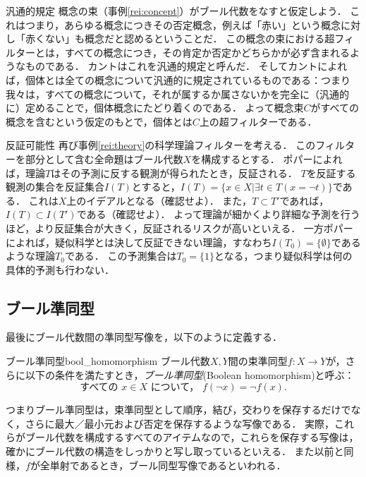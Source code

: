 \documentclass[11pt,a4paper, dvipdfmx]{jsarticle}
\begin{document}
\begin{rei}{汎通的規定}{}
概念の束（事例\ref{rei:concept}）がブール代数をなすと仮定しよう．
これはつまり，あらゆる概念につきその否定概念，例えば「赤い」という概念に対し「赤くない」も概念だと認めるということだ．
この概念の束における超フィルターとは，すべての概念につき，その肯定か否定かどちらかが必ず含まれるようなものである．
カントはこれを汎通的規定と呼んだ．
そしてカントによれば，個体とは全ての概念について汎通的に規定されているものである：つまり我々は，すべての概念について，それが属するか属さないかを完全に（汎通的に）定めることで，個体概念にたどり着くのである．
よって概念束$C$がすべての概念を含むという仮定のもとで，個体とは$C$上の超フィルターである．
\end{rei}

\begin{rei}{反証可能性}{}
    再び事例\ref{rei:theory}の科学理論フィルターを考える．
    このフィルターを部分として含む全命題はブール代数$X$を構成するとする．
    ポパーによれば，理論$T$はその予測に反する観測が得られたとき，反証される．
    $T$を反証する観測の集合を反証集合$I(T)$とすると，$I(T)=\{ x \in X | \exists t \in T (x = \neg t) \}$である．
    これは$X$上のイデアルとなる（確認せよ）．
    また，$T \subset T'$であれば，$I(T) \subset I(T')$である（確認せよ）．
    よって理論が細かくより詳細な予測を行うほど，より反証集合が大きく，反証されるリスクが高いといえる．
    一方ポパーによれば，疑似科学とは決して反証できない理論，すなわち$I(T_0)= \{ \emptyset \}$であるような理論$T_0$である．
    この予測集合は$T_0 = \{1\}$となる，つまり疑似科学は何の具体的予測も行わない．
\end{rei}

\subsection{ブール準同型}

最後にブール代数間の準同型写像を，以下のように定義する．

\begin{dfn}{ブール準同型}{bool_homomorphism}
    ブール代数$X, Y$間の束準同型$f:X \to Y$が，さらに以下の条件を満たすとき，\emph{ブール準同型}(Boolean homomorphism)と呼ぶ：
    \[ \text{すべての } x \in X \text{ について， } f(\neg x) = \neg f(x) . \]
\end{dfn}

つまりブール準同型は，束準同型として順序，結び，交わりを保存するだけでなく，さらに最大／最小元および否定を保存するような写像である．
実際，これらがブール代数を構成するすべてのアイテムなので，これらを保存する写像は，確かにブール代数の構造をしっかりと写し取っているといえる．
また以前と同様，$f$が全単射であるとき，ブール同型写像であるといわれる．
\end{document}
